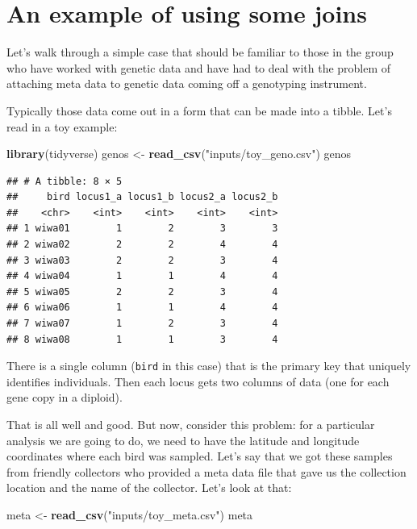 \documentclass[]{book}
\newenvironment{Shaded}{\begin{snugshade}}{\end{snugshade}}
\newcommand{\KeywordTok}[1]{\textcolor[rgb]{0.13,0.29,0.53}{\textbf{{#1}}}}
\newcommand{\StringTok}[1]{\textcolor[rgb]{0.31,0.60,0.02}{{#1}}}
\newcommand{\NormalTok}[1]{{#1}}
\theoremstyle{definition}
\theoremstyle{definition}
\theoremstyle{remark}
\begin{document}
\section{An example of using some
joins}\label{an-example-of-using-some-joins}

Let's walk through a simple case that should be familiar to those in the
group who have worked with genetic data and have had to deal with the
problem of attaching meta data to genetic data coming off a genotyping
instrument.

Typically those data come out in a form that can be made into a tibble.
Let's read in a toy example:

\begin{Shaded}
\begin{Highlighting}[]
\KeywordTok{library}\NormalTok{(tidyverse)}
\NormalTok{genos <-}\StringTok{ }\KeywordTok{read_csv}\NormalTok{(}\StringTok{"inputs/toy_geno.csv"}\NormalTok{)}
\NormalTok{genos}
\end{Highlighting}
\end{Shaded}

\begin{verbatim}
## # A tibble: 8 × 5
##     bird locus1_a locus1_b locus2_a locus2_b
##    <chr>    <int>    <int>    <int>    <int>
## 1 wiwa01        1        2        3        3
## 2 wiwa02        2        2        4        4
## 3 wiwa03        2        2        3        4
## 4 wiwa04        1        1        4        4
## 5 wiwa05        2        2        3        4
## 6 wiwa06        1        1        4        4
## 7 wiwa07        1        2        3        4
## 8 wiwa08        1        1        3        4
\end{verbatim}

There is a single column (\texttt{bird} in this case) that is the
primary key that uniquely identifies individuals. Then each locus gets
two columns of data (one for each gene copy in a diploid).

That is all well and good. But now, consider this problem: for a
particular analysis we are going to do, we need to have the latitude and
longitude coordinates where each bird was sampled. Let's say that we got
these samples from friendly collectors who provided a meta data file
that gave us the collection location and the name of the collector.
Let's look at that:

\begin{Shaded}
\begin{Highlighting}[]
\NormalTok{meta <-}\StringTok{ }\KeywordTok{read_csv}\NormalTok{(}\StringTok{"inputs/toy_meta.csv"}\NormalTok{)}
\NormalTok{meta}
\end{Highlighting}
\end{Shaded}
\end{document}
